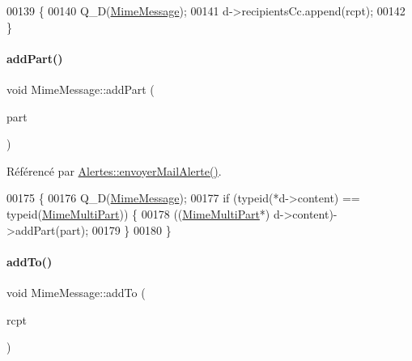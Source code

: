 \begin{DoxyCode}
00139 \{
00140     Q\_D(\hyperlink{class_simple_mail_1_1_mime_message}{MimeMessage});
00141     d->recipientsCc.append(rcpt);
00142 \}
\end{DoxyCode}
\mbox{\label{class_simple_mail_1_1_mime_message_ae4591e5e94961bd10dfabfd1a89d9fbd}} 
\paragraph{\texorpdfstring{add\+Part()}{addPart()}}
{\footnotesize\ttfamily void Mime\+Message\+::add\+Part (\begin{DoxyParamCaption}\item[{\hyperlink{class_simple_mail_1_1_mime_part}{Mime\+Part} $\ast$}]{part }\end{DoxyParamCaption})}



Référencé par \hyperlink{class_alertes_a375783502a78109f3323dc1ed90cfdc9}{Alertes\+::envoyer\+Mail\+Alerte()}.


\begin{DoxyCode}
00175 \{
00176     Q\_D(\hyperlink{class_simple_mail_1_1_mime_message}{MimeMessage});
00177     \textcolor{keywordflow}{if} (\textcolor{keyword}{typeid}(*d->content) == \textcolor{keyword}{typeid}(\hyperlink{class_simple_mail_1_1_mime_multi_part}{MimeMultiPart})) \{
00178         ((\hyperlink{class_simple_mail_1_1_mime_multi_part}{MimeMultiPart}*) d->content)->addPart(part);
00179     \}
00180 \}
\end{DoxyCode}
\mbox{\label{class_simple_mail_1_1_mime_message_ae49bed2a8717ed6cacdb66f2570c2740}} 
\paragraph{\texorpdfstring{add\+To()}{addTo()}}
{\footnotesize\ttfamily void Mime\+Message\+::add\+To (\begin{DoxyParamCaption}\item[{const \hyperlink{class_simple_mail_1_1_email_address}{Email\+Address} \&}]{rcpt }\end{DoxyParamCaption})}



